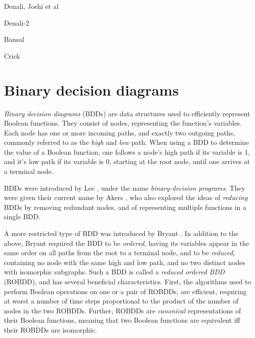 \documentclass[a4paper,11pt]{kth-mag}
\begin{document}
Denali, Joshi et al \cite{joshi02}

Denali-2 \cite{joshi06}

Bansal \cite{bansal_thesis}

Crick \cite{crick_thesis}

\cite{aha}
\cite{pic}

\section{Binary decision diagrams}

\emph{Binary decision diagrams} (BDDs) are data structures used to efficiently represent Boolean functions.
They consist of nodes, representing the function's variables. Each node has one or more incoming paths, and exactly two outgoing paths, commonly referred to as the \emph{high} and \emph{low} path.
When using a BDD to determine the value of a Boolean function, one follows a node's high path if its variable is 1, and it's low path if its variable is 0, starting at the root node, until one arrives at a terminal node.

BDDs were introduced by Lee \cite{lee59}, under the name \emph{binary-decision programs}.
They were given their current name by Akers \cite{akers78}, who also explored the ideas of \emph{reducing} BDDs by removing redundant nodes, and of representing multiple functions in a single BDD.

A more restricted type of BDD was introduced by Bryant \cite{bryant86}.
In addition to the above, Bryant required the BDD to be \emph{ordered}, having its variables appear in the same order on all paths from the root to a terminal node,
and to be \emph{reduced}, containing no node with the same high and low path, and no two distinct nodes with isomorphic subgraphs.
Such a BDD is called a \emph{reduced ordered BDD} (ROBDD), and has several beneficial characteristics.
First, the algorithms used to perform Boolean operations on one or a pair of ROBDDs, are efficient, requiring at worst a number of time steps proportional to the product of the number of nodes in the two ROBDDs.
Further, ROBDDs are \emph{canonical} representations of their Boolean functions, meaning that two Boolean functions are equivalent iff their ROBDDs are isomorphic.
\end{document}
